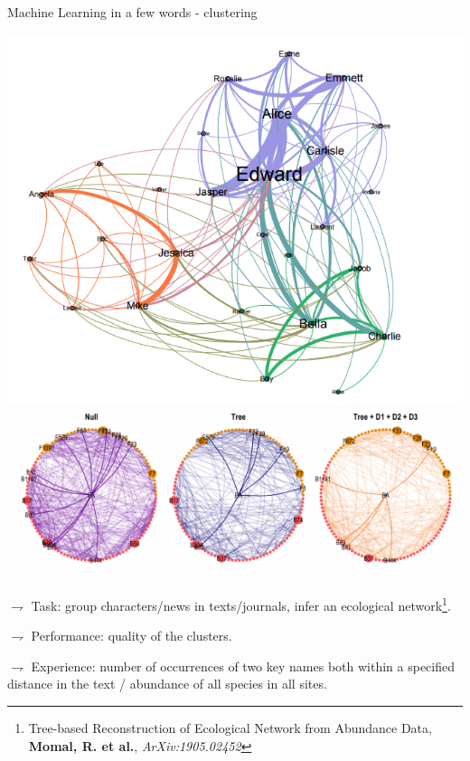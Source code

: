 \documentclass[9pt]{beamer}
\begin{document}
\begin{frame}{Machine Learning in a few words - clustering}
\begin{center}
\includegraphics[scale=.2]{twlght.png}
\includegraphics[scale=.45]{network.png}
\end{center}

\vspace{-.4cm}

$\rightharpoondown$  \alert{Task}: group characters/news in texts/journals, infer an ecological network\footnote{{\tiny Tree-based Reconstruction of Ecological Network from Abundance Data, {\bf Momal, R. et al.}, {\em ArXiv:1905.02452}}}.


$\rightharpoondown$  \alert{Performance}: quality of the clusters.


$\rightharpoondown$  \alert{Experience}:  number of occurrences of two key names both within a specified distance in the text /  abundance of all species  in all sites.

\end{frame}
\end{document}
